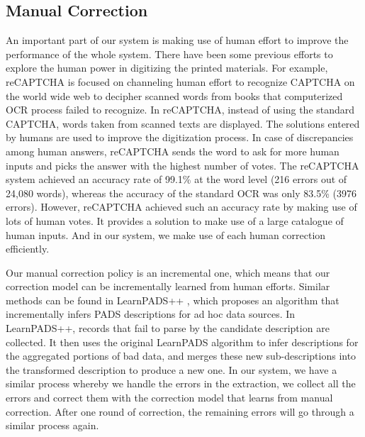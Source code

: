 \subsection{Manual Correction}
An important part of our system is making use of human effort 
to improve the performance of the whole system. 
There have been some previous efforts to explore the human power in 
digitizing the printed materials. For example, reCAPTCHA \cite{von2008recaptcha} 
is focused on channeling human effort to recognize CAPTCHA 
on the world wide web to decipher scanned words from books that computerized 
OCR process failed to recognize. In reCAPTCHA, 
instead of using the standard CAPTCHA, words taken from scanned texts 
are displayed. The solutions entered by humans are used to improve the 
digitization process. 
In case of discrepancies among human answers, reCAPTCHA sends the word to 
ask for more human inputs and picks the answer with the highest 
number of votes. 
The reCAPTCHA system achieved an accuracy rate 
of 99.1\% at the word level (216 errors out of 24,080 words), 
whereas the accuracy of the standard OCR was only 83.5\% (3976 errors). 
However, reCAPTCHA achieved such an accuracy rate by making use of lots of human votes. 
It provides a solution to make use of a large catalogue of human inputs. 
And in our system, we make use of each human correction efficiently. 

Our manual correction policy is an incremental one, which means 
that our correction model can be incrementally learned from human 
efforts. Similar methods can be found in LearnPADS++ \cite{zhu2012learnpads++}, 
which proposes an algorithm that incrementally infers PADS descriptions 
for ad hoc data sources. In LearnPADS++, records that fail to 
parse by the candidate description are collected. It then uses 
the original LearnPADS algorithm to infer descriptions for the 
aggregated portions of bad data, and merges these
new sub-descriptions into the transformed description to produce a new 
one. In our system, we have a similar process whereby we handle the errors 
in the extraction, we collect all the errors and correct them with 
the correction model that learns from manual correction. 
After one round of correction, the remaining 
errors will go through a similar process again. 

